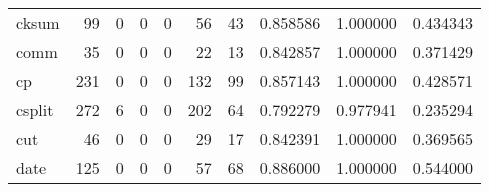\begin{longtable}{lrrrrrrrrr}
cksum     &                                        99 &                                                  0 &                                                  0 &                                                  0 &                                                 56 &                                                 43 &                                           0.858586 &                               1.000000 &                             0.434343 \\
comm      &                                        35 &                                                  0 &                                                  0 &                                                  0 &                                                 22 &                                                 13 &                                           0.842857 &                               1.000000 &                             0.371429 \\
cp        &                                       231 &                                                  0 &                                                  0 &                                                  0 &                                                132 &                                                 99 &                                           0.857143 &                               1.000000 &                             0.428571 \\
csplit    &                                       272 &                                                  6 &                                                  0 &                                                  0 &                                                202 &                                                 64 &                                           0.792279 &                               0.977941 &                             0.235294 \\
cut       &                                        46 &                                                  0 &                                                  0 &                                                  0 &                                                 29 &                                                 17 &                                           0.842391 &                               1.000000 &                             0.369565 \\
date      &                                       125 &                                                  0 &                                                  0 &                                                  0 &                                                 57 &                                                 68 &                                           0.886000 &                               1.000000 &                             0.544000 \\

\end{longtable}
